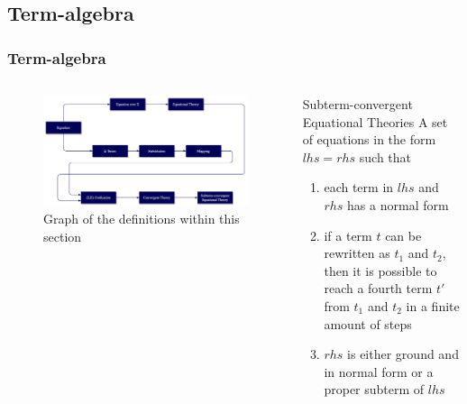 \documentclass[aspectratio=169,t,xcolor=table]{beamer}
\begin{document}
\subsection{Term-algebra}
\begin{frame}
    \frametitle{Term-algebra}
    \begin{columns}
            \begin{figure}
                \includegraphics[width=\textwidth]{images/definitions.png}
                \caption{Graph of the definitions within this section}
            \end{figure}
            \begin{block}{Subterm-convergent Equational Theories}
                A set of equations in the form $lhs = rhs$ such that
                \begin{enumerate}
                    \item each term in $lhs$ and $rhs$ has a normal form
                    \item if a term $t$ can be rewritten as $t_1$ and $t_2$, then it is possible to reach a fourth term $t'$ from $t_1$ and $t_2$ in a finite amount of steps
                    \item $rhs$ is either ground and in normal form or a proper subterm of $lhs$
                \end{enumerate}
            \end{block}
    \end{columns}
\end{frame}
\end{document}
